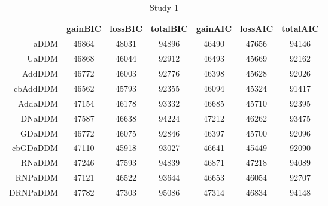 \begin{table}[ht]
\centering
\begin{tabular}{|r|ccc|ccc|}
  \hline
 & gainBIC & lossBIC & totalBIC & gainAIC & lossAIC & totalAIC \\ 
  \hline
aDDM & 46864 & 48031 & 94896 & 46490 & 47656 & 94146 \\ 
  UaDDM & 46868 & 46044 & 92912 & 46493 & 45669 & 92162 \\ 
  AddDDM & 46772 & 46003 & 92776 & 46398 & 45628 & 92026 \\ 
  cbAddDDM & 46562 & 45793 & 92355 & 46094 & 45324 & 91417 \\ 
  AddaDDM & 47154 & 46178 & 93332 & 46685 & 45710 & 92395 \\ 
  DNaDDM & 47587 & 46638 & 94224 & 47212 & 46262 & 93475 \\ 
  GDaDDM & 46772 & 46075 & 92846 & 46397 & 45700 & 92096 \\ 
  cbGDaDDM & 47110 & 45918 & 93027 & 46641 & 45449 & 92090 \\ 
  RNaDDM & 47246 & 47593 & 94839 & 46871 & 47218 & 94089 \\ 
  RNPaDDM & 47121 & 46522 & 93644 & 46653 & 46054 & 92707 \\ 
  DRNPaDDM & 47782 & 47303 & 95086 & 47314 & 46834 & 94148 \\ 
   \hline
\end{tabular}
\caption{Study 1} 
\end{table}

